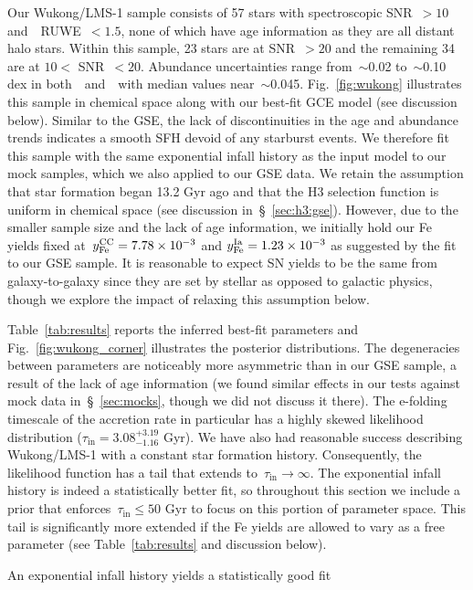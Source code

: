 \documentclass[ms.tex]{subfiles}
\begin{document}
Our Wukong/LMS-1 sample consists of 57 stars with spectroscopic SNR~$> 10$
and~\gaia~RUWE~$< 1.5$, none of which have age information as they are all
distant halo stars.
Within this sample, 23 stars are at SNR~$> 20$ and the remaining 34 are at
$10 <$ SNR~$< 20$.
Abundance uncertainties range from~$\sim$0.02 to~$\sim$0.10 dex in
both~\afe~and~\feh~with median values near~$\sim$0.045.
Fig.~\ref{fig:wukong} illustrates this sample in chemical space along with our
best-fit GCE model (see discussion below).
Similar to the GSE, the lack of discontinuities in the age and abundance trends
indicates a smooth SFH devoid of any starburst events.
We therefore fit this sample with the same exponential infall history as the
input model to our mock samples, which we also applied to our GSE data.
We retain the assumption that star formation began 13.2 Gyr ago and that the H3
selection function is uniform in chemical space (see discussion
in~\S~\ref{sec:h3:gse}).
However, due to the smaller sample size and the lack of age information, we
initially hold our Fe yields fixed at~$y_\text{Fe}^\text{CC} = 7.78\times10^{-3}$ and
$y_\text{Fe}^\text{Ia} = 1.23\times10^{-3}$ as suggested by the fit to our GSE sample.
It is reasonable to expect SN yields to be the same from galaxy-to-galaxy since
they are set by stellar as opposed to galactic physics, though we explore the
impact of relaxing this assumption below.
\par
Table~\ref{tab:results} reports the inferred best-fit parameters and
Fig.~\ref{fig:wukong_corner} illustrates the posterior distributions.
The degeneracies between parameters are noticeably more asymmetric than in our
GSE sample, a result of the lack of age information (we found similar effects
in our tests against mock data in~\S~\ref{sec:mocks}, though we did not discuss
it there).
The e-folding timescale of the accretion rate in particular has a highly skewed
likelihood distribution ($\tau_\text{in} = 3.08^{+3.19}_{-1.16}$ Gyr).
We have also had reasonable success describing Wukong/LMS-1 with a constant
star formation history.
Consequently, the likelihood function has a tail that extends
to~$\tau_\text{in} \rightarrow \infty$.
The exponential infall history is indeed a statistically better fit, so
throughout this section we include a prior that
enforces~$\tau_\text{in} \leq 50$ Gyr to focus on this portion of parameter
space.
This tail is significantly more extended if the Fe yields are allowed to vary
as a free parameter (see Table~\ref{tab:results} and discussion below).
\par
An exponential infall history yields a statistically good fit
\end{document}
